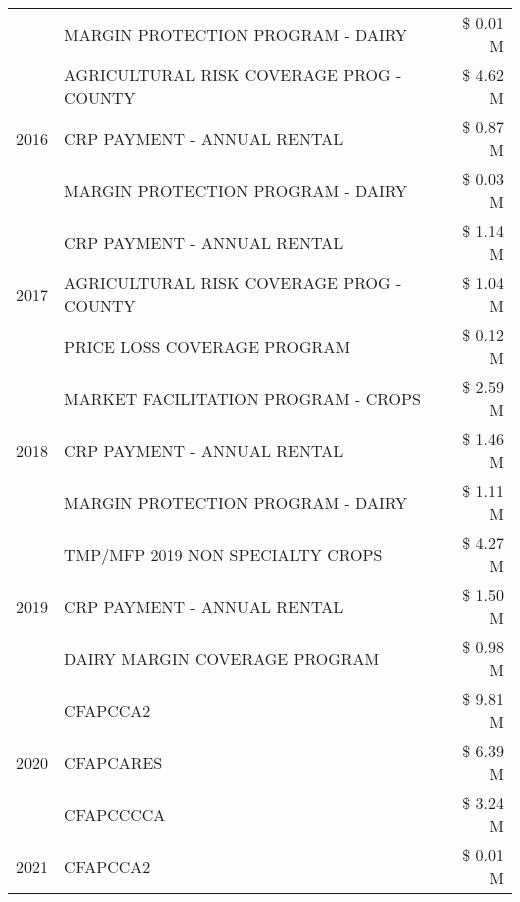\begin{tabular}{llr}
 & MARGIN PROTECTION PROGRAM - DAIRY & \$ 0.01 M \\
\cline{1-3}
\multirow[t]{3}{*}{2016} & AGRICULTURAL RISK COVERAGE PROG - COUNTY & \$ 4.62 M \\
 & CRP PAYMENT - ANNUAL RENTAL & \$ 0.87 M \\
 & MARGIN PROTECTION PROGRAM - DAIRY & \$ 0.03 M \\
\cline{1-3}
\multirow[t]{3}{*}{2017} & CRP PAYMENT - ANNUAL RENTAL & \$ 1.14 M \\
 & AGRICULTURAL RISK COVERAGE PROG - COUNTY & \$ 1.04 M \\
 & PRICE LOSS COVERAGE PROGRAM & \$ 0.12 M \\
\cline{1-3}
\multirow[t]{3}{*}{2018} & MARKET FACILITATION PROGRAM - CROPS & \$ 2.59 M \\
 & CRP PAYMENT - ANNUAL RENTAL & \$ 1.46 M \\
 & MARGIN PROTECTION PROGRAM - DAIRY & \$ 1.11 M \\
\cline{1-3}
\multirow[t]{3}{*}{2019} & TMP/MFP 2019 NON SPECIALTY CROPS & \$ 4.27 M \\
 & CRP PAYMENT - ANNUAL RENTAL & \$ 1.50 M \\
 & DAIRY MARGIN COVERAGE PROGRAM & \$ 0.98 M \\
\cline{1-3}
\multirow[t]{3}{*}{2020} & CFAPCCA2 & \$ 9.81 M \\
 & CFAPCARES & \$ 6.39 M \\
 & CFAPCCCCA & \$ 3.24 M \\
\cline{1-3}
2021 & CFAPCCA2 & \$ 0.01 M \\
\cline{1-3}
\bottomrule
\end{tabular}
